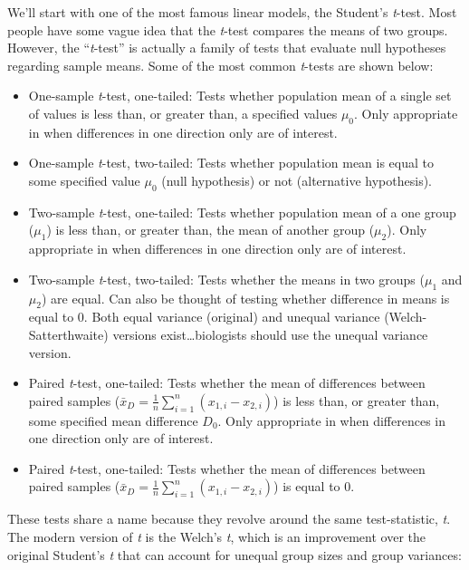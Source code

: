 \documentclass[
  13,
  letterpaper,
]{report}
\providecommand{\tightlist}{%
  \setlength{\itemsep}{0pt}\setlength{\parskip}{0pt}}
\begin{document}
We'll start with one of the most famous linear models, the Student's
\emph{t}-test. Most people have some vague idea that the \emph{t}-test
compares the means of two groups. However, the ``\emph{t}-test'' is
actually a family of tests that evaluate null hypotheses regarding
sample means. Some of the most common \emph{t}-tests are shown below:

\begin{itemize}
\tightlist
\item
  One-sample \emph{t}-test, one-tailed: Tests whether population mean of
  a single set of values is less than, or greater than, a specified
  values \(\mu_0\). Only appropriate in when differences in one
  direction only are of interest.
\item
  One-sample \emph{t}-test, two-tailed: Tests whether population mean is
  equal to some specified value \(\mu_0\) (null hypothesis) or not
  (alternative hypothesis).
\item
  Two-sample \emph{t}-test, one-tailed: Tests whether population mean of
  a one group (\(\mu_1\)) is less than, or greater than, the mean of
  another group (\(\mu_2\)). Only appropriate in when differences in one
  direction only are of interest.
\item
  Two-sample \emph{t}-test, two-tailed: Tests whether the means in two
  groups (\(\mu_1\) and \(\mu_2\)) are equal. Can also be thought of
  testing whether difference in means is equal to 0. Both equal variance
  (original) and unequal variance (Welch-Satterthwaite) versions
  exist\ldots biologists should use the unequal variance version.
\item
  Paired \emph{t}-test, one-tailed: Tests whether the mean of
  differences between paired samples
  (\({\bar{x}}_D=\frac{1}{n}\sum_{i=1}^{n}\left(x_{1,i}-x_{2,i}\right)\))
  is less than, or greater than, some specified mean difference \(D_0\).
  Only appropriate in when differences in one direction only are of
  interest.
\item
  Paired \emph{t}-test, one-tailed: Tests whether the mean of
  differences between paired samples
  (\({\bar{x}}_D=\frac{1}{n}\sum_{i=1}^{n}\left(x_{1,i}-x_{2,i}\right)\))
  is equal to 0.
\end{itemize}

These tests share a name because they revolve around the same
test-statistic, \emph{t}. The modern version of \emph{t} is the Welch's
\emph{t}, which is an improvement over the original Student's \emph{t}
that can account for unequal group sizes and group variances:
\end{document}
